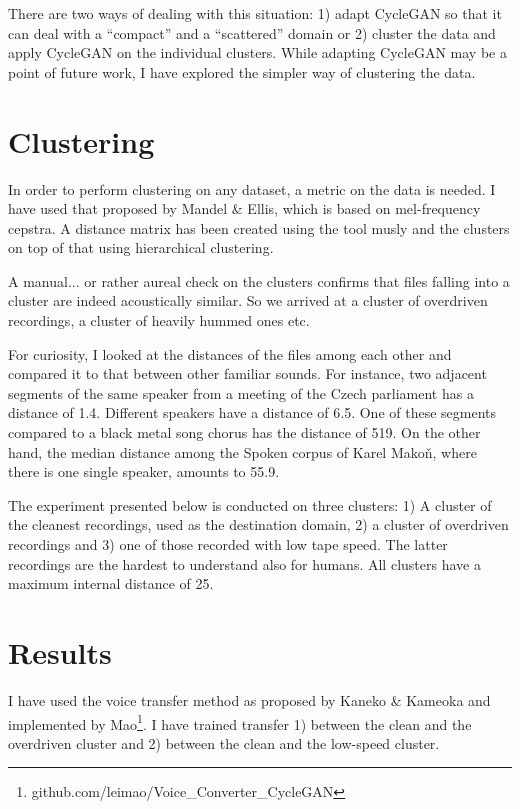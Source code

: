 \documentclass[runningheads,a4paper]{llncs}
\begin{document}
There are two ways of dealing with this situation: 1) adapt CycleGAN so that it
can deal with a ``compact'' and a ``scattered'' domain or 2) cluster the
data and apply CycleGAN on the individual clusters. While adapting CycleGAN may be a
point of future work, I have explored the simpler way of clustering the data.

\section{Clustering}

In order to perform clustering on any dataset, a metric on the data is needed.
I have used that proposed by Mandel \& Ellis\cite{mandel2005song}, which
is based on mel-frequency cepstra. A distance matrix has been created using the
tool musly\cite{schnitzer2011using} and the clusters on top of that using
hierarchical clustering\cite{johnson1967hierarchical}.

A manual... or rather aureal check on the clusters confirms that files falling
into a cluster are indeed acoustically similar. So we arrived at a cluster of
overdriven recordings, a cluster of heavily hummed ones etc.

For curiosity, I looked at the distances of the files among each other and
compared it to that between other familiar sounds. For instance, two adjacent
segments of the same speaker from a meeting of the Czech parliament has a
distance of 1.4. Different speakers have a distance of 6.5. One of these
segments compared to a black metal song chorus has the distance of 519. On the
other hand, the median distance among the Spoken corpus of Karel Makoň, where
there is one single speaker, amounts to 55.9.

The experiment presented below is conducted on three clusters: 1) A cluster
of the cleanest recordings, used as the destination domain, 2) a cluster of
overdriven recordings and 3) one of those recorded with low tape speed. The
latter recordings are the hardest to understand also for humans. All clusters
have a maximum internal distance of 25.

\section{Results}

I have used the voice transfer method as proposed by Kaneko \&
Kameoka\cite{kaneko2017parallel} and implemented by
Mao\footnote{github.com/leimao/Voice\_Converter\_CycleGAN}. I have trained
transfer 1) between the clean and the overdriven cluster and 2) between the
clean and the low-speed cluster.
\end{document}
